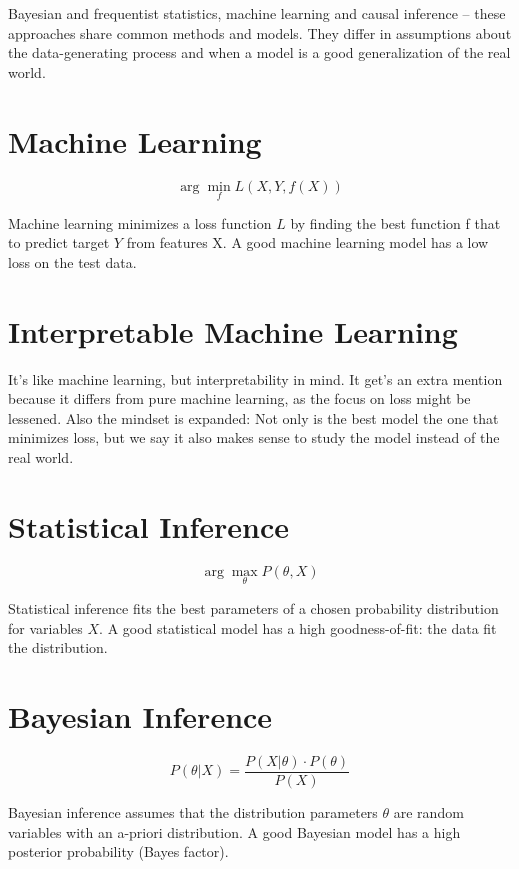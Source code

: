 \documentclass[
  14pt,
]{article}
\begin{document}
Bayesian and frequentist statistics, machine learning and causal inference -- these approaches share common methods and models.
They differ in assumptions about the data-generating process and when a model is a good generalization of the real world.

\hypertarget{machine-learning}{%
\section{Machine Learning}\label{machine-learning}}

\[\arg\min_f L(X,Y,f(X))\]

Machine learning minimizes a loss function \(L\) by finding the best function f that to predict target \(Y\) from features X.
A good machine learning model has a low loss on the test data.

\hypertarget{interpretable-machine-learning}{%
\section{Interpretable Machine Learning}\label{interpretable-machine-learning}}

It's like machine learning, but interpretability in mind.
It get's an extra mention because it differs from pure machine learning, as the focus on loss might be lessened.
Also the mindset is expanded: Not only is the best model the one that minimizes loss, but we say it also makes sense to study the model instead of the real world.

\hypertarget{statistical-inference}{%
\section{Statistical Inference}\label{statistical-inference}}

\[\arg\max_{\theta} P(\theta, X)\]

Statistical inference fits the best parameters of a chosen probability distribution for variables \(X\).
A good statistical model has a high goodness-of-fit: the data fit the distribution.

\hypertarget{bayesian-inference}{%
\section{Bayesian Inference}\label{bayesian-inference}}

\[P(\theta | X) = \frac{P(X | \theta) \cdot P(\theta)}{P(X)}\]

Bayesian inference assumes that the distribution parameters \(\theta\) are random variables with an a-priori distribution.
A good Bayesian model has a high posterior probability (Bayes factor).
\end{document}
